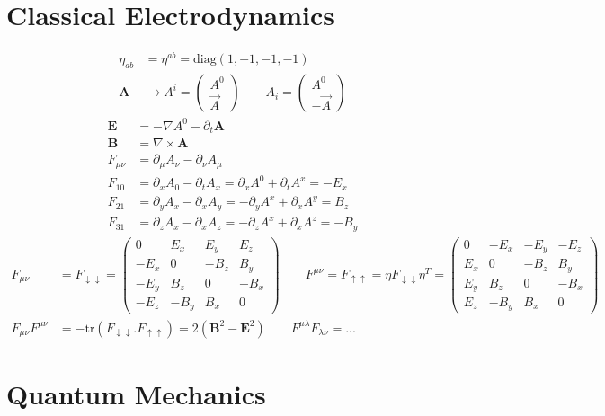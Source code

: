 \documentclass[10pt,a4paper]{book}
\theoremstyle{definition}
\begin{document}
\section{Classical Electrodynamics}
\begin{align}
\eta_{ab}&=\eta^{ab}=\text{diag}(1,-1,-1,-1)\\
\mathbf{A}&\rightarrow A^i=\begin{pmatrix}
A^0\\
\vec{A}
\end{pmatrix}\qquad A_i=\begin{pmatrix}
A^0\\
-\vec{A}
\end{pmatrix}
\end{align}
\begin{align}
\mathbf{E}&=-\nabla A^0-\partial_t\mathbf{A}\\
\mathbf{B}&=\nabla\times\mathbf{A}\\
F_{\mu\nu}&=\partial_\mu A_\nu-\partial_\nu A_\mu\\
F_{10}&=\partial_xA_0-\partial_tA_x=\partial_xA^0+\partial_tA^x=-E_x\\
F_{21}&=\partial_yA_x-\partial_xA_y=-\partial_yA^x+\partial_xA^y=B_z\\
F_{31}&=\partial_zA_x-\partial_xA_z=-\partial_zA^x+\partial_xA^z=-B_y
\end{align}
\begin{align}
F_{\mu\nu}&=F_{\downarrow\downarrow}=\begin{pmatrix}
0    &  E_x & E_y  & E_z\\
-E_x &  0   & -B_z & B_y\\
-E_y &  B_z & 0    & -B_x\\
-E_z & -B_y & B_x  & 0
\end{pmatrix}
\qquad
F^{\mu\nu}=F_{\uparrow\uparrow}=\eta F_{\downarrow\downarrow}\eta^T=\begin{pmatrix}
0    &  -E_x & -E_y  & -E_z\\
E_x &  0   & -B_z & B_y\\
E_y &  B_z & 0    & -B_x\\
E_z & -B_y & B_x  & 0
\end{pmatrix}\\
F_{\mu\nu}F^{\mu\nu}&=-\text{tr}(F_{\downarrow\downarrow}.F_{\uparrow\uparrow})=2(\mathbf{B}^2-\mathbf{E}^2)
\qquad
F^{\mu\lambda}F_{\lambda\nu}=...
\end{align}

\section{Quantum Mechanics}
\end{document}
